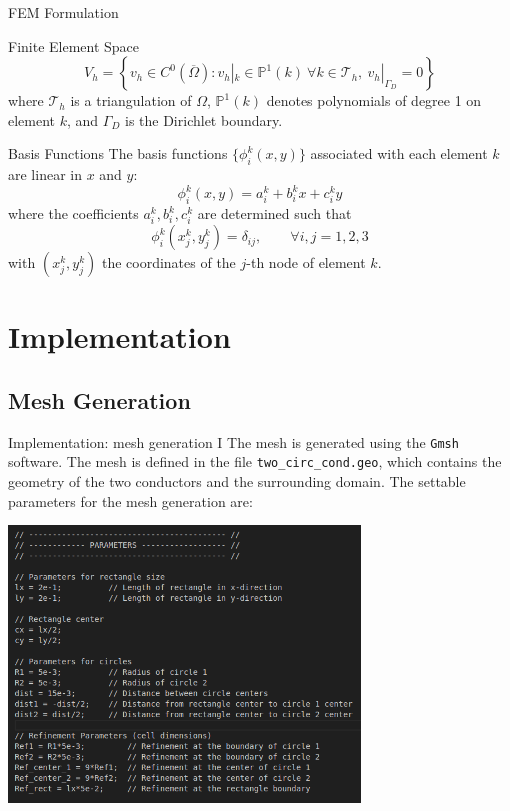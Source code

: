 \documentclass[aspectratio=54,xcolor=dvipsnames]{beamer}
\begin{document}
\begin{frame}{FEM Formulation}
    \begin{block}{Finite Element Space}
    \[
    V_h = \left\{ v_h \in C^0(\overline{\Omega}) : v_h|_k \in \mathbb{P}^1(k)\ \forall k \in \mathcal{T}_h,\ v_h|_{\Gamma_D} = 0 \right\}
    \]
    where $\mathcal{T}_h$ is a triangulation of $\Omega$, $\mathbb{P}^1(k)$ denotes polynomials of degree 1 on element $k$, and $\Gamma_D$ is the Dirichlet boundary.
    \end{block}
    \begin{block}{Basis Functions}
    The basis functions $\{\phi_i^k(x, y)\}$ associated with each element $k$ are linear in $x$ and $y$:
    \[
    \phi_i^k(x, y) = a_i^k + b_i^k x + c_i^k y
    \]
    where the coefficients $a_i^k, b_i^k, c_i^k$ are determined such that
    \[
    \phi_i^k(x_j^k, y_j^k) = \delta_{ij}, \qquad \forall i, j = 1,2,3
    \]
    with $(x_j^k, y_j^k)$ the coordinates of the $j$-th node of element $k$.
    \end{block}
    
\end{frame}

\section{Implementation}
\subsection{Mesh Generation}
\begin{frame}{Implementation: mesh generation I}
    The mesh is generated using the \texttt{Gmsh} software. The mesh is defined in the file \texttt{two\_circ\_cond.geo}, which contains the geometry of the two conductors and the surrounding domain. The settable parameters for the mesh generation are:
    \begin{center}
         \includegraphics[width=0.7\textwidth]{Images/Gmsh_parameters.png}
    \end{center}
\end{frame}
\end{document}
